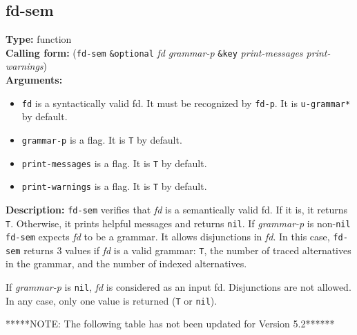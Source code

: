 \documentclass[10pt,a4paper]{report}
\begin{document}
\subsection{fd-sem}
{\bf Type:} function
\\{\bf Calling form:} ({\tt fd-sem} {\tt \&optional} {\em fd} {\em grammar-p} {\tt \&key}
{\em print-messages print-warnings})
\\{\bf Arguments:} 
\begin{itemize}
\item {\tt fd} is a syntactically valid fd. It must be recognized by
{\tt fd-p}. It is {\tt *u-grammar*} by default.

\item {\tt grammar-p} is a flag. It is {\tt T} by default.

\item {\tt print-messages} is a flag.  It is {\tt T} by default.

\item {\tt print-warnings} is a flag.  It is {\tt T} by default.
\end{itemize}
{\bf Description:} {\tt fd-sem} verifies that {\em fd} is a
semantically valid fd. If it is, it returns {\tt T}. Otherwise, it
prints helpful messages and returns {\tt nil}.
If {\em grammar-p} is non-{\tt nil} {\tt fd-sem} expects {\em fd} to be a
grammar. It allows disjunctions in {\em fd}. In this case,
{\tt fd-sem} returns 3 values if {\em fd} is a valid grammar: {\tt T},
the number of traced alternatives in the grammar, and the number
of indexed alternatives. 

If {\em grammar-p} is {\tt nil}, {\em fd} is considered as an input fd.
Disjunctions are not allowed. In any case, only one value is
returned ({\tt T} or {\tt nil}).

*****NOTE: The following table has not been updated for Version 5.2******
\end{document}
